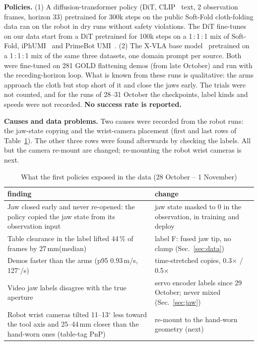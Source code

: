 \documentclass[conference,10pt]{IEEEtran}
\newcommand{\mm}{\,mm\xspace}
\begin{document}
\textbf{Policies.} (1) A diffusion-transformer policy (DiT, CLIP~\cite{radford2021clip} text, 2 observation frames,
horizon 33) pretrained for 300k steps on the public Soft-Fold cloth-folding data ran on the robot in dry runs without
safety violations. The DiT fine-tunes on our data start from a DiT pretrained for 100k steps on a 1\,:\,1\,:\,1 mix of
Soft-Fold, iPhUMI~\cite{iphumi} and PrimeBot UMI~\cite{primebot}. (2) The X-VLA base model~\cite{xvla} pretrained on a
1\,:\,1\,:\,1 mix of the same three datasets, one domain prompt per source. Both were fine-tuned on 281 GOLD flattening
demos (from late October) and run with the receding-horizon loop. What is known from these runs is qualitative: the
arms approach the cloth but stop short of it and close the jaws early. The trials were not counted, and for the runs of
28--31 October the checkpoints, label kinds and speeds were not recorded. \textbf{No success rate is reported.}

\textbf{Causes and data problems.} Two causes were recorded from the robot runs: the jaw-state copying and the
wrist-camera placement (first and last rows of Table~\ref{tab:causes}). The other three rows were found afterwards by
checking the labels. All but the camera re-mount are changed; re-mounting the robot wrist cameras is next.

\begin{table}[t]
\caption{What the first policies exposed in the data (28 October -- 1 November)}\label{tab:causes}
\centering\small
\begin{tabular}{@{}>{\raggedright\arraybackslash}p{}>{\raggedright\arraybackslash}p{}@{}}
\toprule
finding & change \\
\midrule
Jaw closed early and never re-opened: the policy copied the jaw state from its observation input & jaw state masked to 0 in the observation, in training and deploy \\
Table clearance in the label lifted 44\,\% of frames by 27\mm (median) & label F: fused jaw tip, no clamp (Sec.~\ref{sec:data}) \\
Demos faster than the arms (p95 0.93\,m/s, 127$^\circ$/s) & time-stretched copies, 0.3$\times$ / 0.5$\times$ \\
Video jaw labels disagree with the true aperture & servo encoder labels since 29 October; never mixed (Sec.~\ref{sec:jaw}) \\
Robot wrist cameras tilted 11--13$^\circ$ less toward the tool axis and 25--44\mm closer than the hand-worn ones (table-tag PnP) & re-mount to the hand-worn geometry (next) \\
\bottomrule
\end{tabular}
\end{table}
\end{document}
